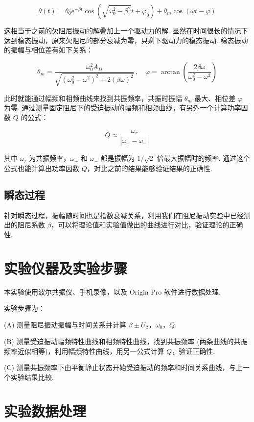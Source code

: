 \documentclass{THUexprep}
\begin{document}
\begin{equation}
    \theta(t) = \theta_0e^{-\beta t}\cos(\sqrt{\omega_0^2-\beta^2}t+\varphi_0)+\theta_m\cos(\omega t-\varphi)
\end{equation}

这相当于之前的欠阻尼振动的解叠加上一个驱动力的解. 显然在时间很长的情况下达到稳态振动，原来欠阻尼的部分衰减为零，只剩下驱动力的稳态振动. 稳态振动的振幅与相位差有如下关系：

\begin{equation}
    \theta_m = \frac{\omega_0^2A_D}{\sqrt{(\omega_0^2-\omega^2)^2+2(\beta\omega)^2}}\,,\quad
    \varphi = \arctan\left(\frac{2\beta\omega}{\omega_0^2-\omega^2}\right)
\end{equation}

此时就能通过幅频和相频曲线来找到共振频率，共振时振幅 $\theta_m$ 最大、相位差 $\varphi$ 为零. 通过测量固定阻尼下的受迫振动的幅频和相频曲线，有另外一个计算功率因数 $Q$ 的公式：

\begin{equation}
    Q \approx \frac{\omega_r}{|\omega_+-\omega_-|}
\end{equation}

其中 $\omega_r$ 为共振频率，$\omega_+$ 和 $\omega_-$ 都是振幅为 $1/\sqrt{2}$ 倍最大振幅时的频率. 通过这个公式也能计算出功率因数 $Q$，对比之前的结果能够验证结果的正确性.

\subsection{瞬态过程}
针对瞬态过程，振幅随时间也是指数衰减关系，利用我们在阻尼振动实验中已经测出的阻尼系数 $\beta$，可以将理论值和实验值做出的曲线进行对比，验证理论的正确性.

\section{实验仪器及实验步骤}
本实验使用波尔共振仪、手机录像，以及 Origin Pro 软件进行数据处理.

实验步骤为：

(A) 测量阻尼振动振幅与时间关系并计算 $\beta\pm U_\beta$，$\omega_0$，$Q$.

(B) 测量受迫振动幅频特性曲线和相频特性曲线，找到共振频率 (两条曲线的共振频率近似相等)，利用幅频特性曲线，用另一公式计算 $Q$，验证正确性.

(C) 测量共振频率下由平衡静止状态开始受迫振动的频率和时间关系曲线，与上一个实验结果比较.

\section{实验数据处理}
\end{document}
